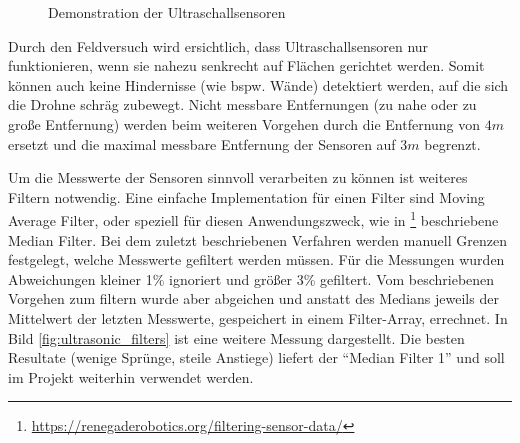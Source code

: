 \begin{figure}[h!]
    \centering

    \caption{Demonstration der Ultraschallsensoren}
    \label{fig:ultrasonic_tests}
\end{figure}

Durch den Feldversuch wird ersichtlich, dass Ultraschallsensoren nur funktionieren, wenn sie nahezu senkrecht auf Flächen gerichtet werden. Somit können auch keine Hindernisse (wie bspw. Wände) detektiert werden, auf die sich die Drohne schräg zubewegt. Nicht messbare Entfernungen (zu nahe oder zu große Entfernung) werden beim weiteren Vorgehen durch die Entfernung von $4m$ ersetzt und die maximal messbare Entfernung der Sensoren auf $3m$ begrenzt.

Um die Messwerte der Sensoren sinnvoll verarbeiten zu können ist weiteres Filtern notwendig. Eine einfache Implementation für einen Filter sind Moving Average Filter, oder speziell für diesen Anwendungszweck, wie in \footnote{\url{https://renegaderobotics.org/filtering-sensor-data/}} beschriebene Median Filter. Bei dem zuletzt beschriebenen Verfahren werden manuell Grenzen festgelegt, welche Messwerte gefiltert werden müssen. Für die Messungen wurden Abweichungen kleiner 1\% ignoriert und größer 3\% gefiltert. Vom beschriebenen Vorgehen zum filtern wurde aber abgeichen und anstatt des Medians jeweils der Mittelwert der letzten Messwerte, gespeichert in einem Filter-Array, errechnet. In Bild \ref{fig:ultrasonic_filters} ist eine weitere Messung dargestellt. Die besten Resultate (wenige Sprünge, steile Anstiege) liefert der \enquote{Median Filter 1} und soll im Projekt weiterhin verwendet werden.

